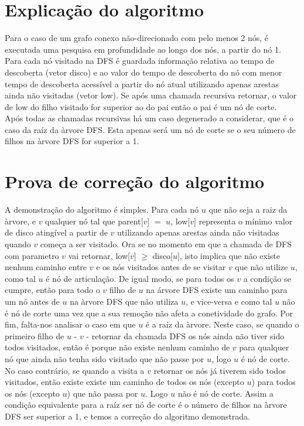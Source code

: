 \documentclass{scrartcl}
\begin{document}
\section*{Explicação do algoritmo}
 Para o caso de um grafo conexo não-direcionado com pelo menos 2 nós, é executada uma pesquisa em profundidade ao longo dos nós, a partir do nó 1. Para cada nó visitado na DFS é guardada informação relativa ao tempo de descoberta (vetor disco) e ao valor do tempo de descoberta do nó com menor tempo de descoberta acessível a partir do nó atual utilizando apenas arestas ainda não visitadas (vetor low). Se após uma chamada recursiva retornar, o valor de low do filho visitado for superior ao do pai então o pai é um nó de corte.\\
Após todas as chamadas recursivas há um caso degenerado a considerar, que é o caso da raíz da àrvore DFS. Esta apenas será um nó de corte se o seu número de filhos na àrvore DFS for superior a 1.

\section*{Prova de correção do algoritmo}
A demonstração do algoritmo é simples. Para cada nó $u$ que não seja a raiz da àrvore, e $v$ qualquer nó tal que parent[$v$] $=$ $u$, low[$v$] representa o mínimo valor de disco atingível a partir de $v$ utilizando apenas arestas ainda não visitadas quando $v$ começa a ser visitado. Ora se no momento em que a chamada de DFS com parametro $v$ vai retornar, low[$v$] $\ge$ disco[$u$], isto implica que não existe nenhum caminho entre $v$ e os nós visitados antes de se visitar $v$ que não utilize $u$, como tal $u$ é nó de articulação. De igual modo, se para todos os $v$ a condição se cumpre, então para todo o $v$ filho de $u$ na árvore DFS existe um caminho para um nó antes de $u$ na àrvore DFS que não utiliza $u$, e vice-versa e como tal $u$ não é nó de corte uma vez que a sua remoção não afeta a conetividade do grafo. Por fim, falta-nos analisar o caso em que $u$ é a raíz da àrvore. Neste caso, se quando o primeiro filho de $u$ - $v$ - retornar da chamada DFS os nós ainda não tiver sido todos visitados, então é porque não existe nenhum caminho de $v$ para qualquer nó que ainda não tenha sido visitado que não passe por $u$, logo $u$ é nó de corte. No caso contrário, se quando a visita a $v$ retornar os nós já tiverem sido todos visitados, então existe existe um caminho de todos os nós (excepto $u$) para todos os nós (excepto $u$) que não passa por $u$. Logo $u$ não é nó de corte. Assim a condição equivalente para a raíz ser nó de corte é o número de filhos na àrvore DFS ser superior a 1, e temos a correção do algoritmo demonstrada.
\end{document}
